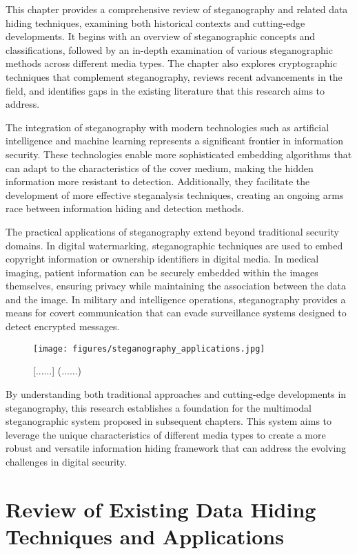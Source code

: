 \documentclass[12pt, a4paper, oneside]{book}
\begin{document}
This chapter provides a comprehensive review of steganography and related data hiding techniques, examining both historical contexts and cutting-edge developments. It begins with an overview of steganographic concepts and classifications, followed by an in-depth examination of various steganographic methods across different media types. The chapter also explores cryptographic techniques that complement steganography, reviews recent advancements in the field, and identifies gaps in the existing literature that this research aims to address.

The integration of steganography with modern technologies such as artificial intelligence and machine learning represents a significant frontier in information security. These technologies enable more sophisticated embedding algorithms that can adapt to the characteristics of the cover medium, making the hidden information more resistant to detection. Additionally, they facilitate the development of more effective steganalysis techniques, creating an ongoing arms race between information hiding and detection methods.

The practical applications of steganography extend beyond traditional security domains. In digital watermarking, steganographic techniques are used to embed copyright information or ownership identifiers in digital media. In medical imaging, patient information can be securely embedded within the images themselves, ensuring privacy while maintaining the association between the data and the image. In military and intelligence operations, steganography provides a means for covert communication that can evade surveillance systems designed to detect encrypted messages.

\begin{figure}[htbp]
    \centering
    \texttt{[image: figures/steganography\_applications.jpg]}
    \caption{[......] (......)}
    \label{fig:stego_applications}
\end{figure}

By understanding both traditional approaches and cutting-edge developments in steganography, this research establishes a foundation for the multimodal steganographic system proposed in subsequent chapters. This system aims to leverage the unique characteristics of different media types to create a more robust and versatile information hiding framework that can address the evolving challenges in digital security.

\section{Review of Existing Data Hiding Techniques and Applications}
\end{document}
